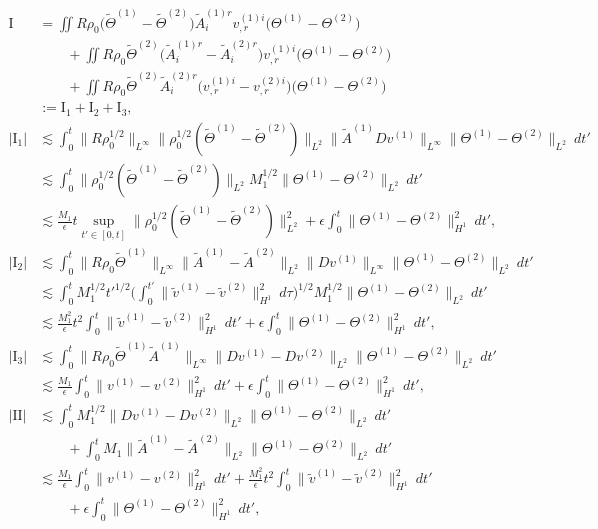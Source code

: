 \documentclass[12pt,a4paper]{amsart}
\numberwithin{equation}{section}
\theoremstyle{plain}
\theoremstyle{definition}
\begin{document}
\begin{align*}
\mathrm{I}&=\iint R\rho_0\Big(\widetilde{\Theta}^{(1)}-\widetilde{\Theta}^{(2)}\Big)\widetilde{A}^{(1)r}_iv^{(1)i}_{,r} \Big( \Theta^{(1)}-\Theta^{(2)}\Big)\\
 &\qquad +\iint R\rho_0\widetilde{\Theta}^{(2)}\Big(\widetilde{A}^{(1)r}_i-\widetilde{A}^{(2)r}_i\Big)v^{(1)i}_{,r} \Big( \Theta^{(1)}-\Theta^{(2)}\Big)\\
 &\qquad +\iint R\rho_0\widetilde{\Theta}^{(2)}\widetilde{A}^{(2)r}_i\Big(v^{(1)i}_{,r} -v^{(2)i}_{,r} \Big)\Big( \Theta^{(1)}-\Theta^{(2)}\Big)\\
 &:=\mathrm{I}_1+ \mathrm{I}_2+\mathrm{I}_3,\\
|\mathrm{I}_1|&\lesssim \int_{0}^{t}\|R\rho_0^{1/2}\|_{L^{\infty}}\|\rho_0^{1/2}(\widetilde{\Theta}^{(1)}-\widetilde{\Theta}^{(2)})\|_{L^2}\|\widetilde{A}^{(1)}Dv^{(1)}\|_{L^{\infty}} \|\Theta^{(1)}-\Theta^{(2)}\|_{L^{2}} \ dt'\\
 &\lesssim \int_{0}^{t}\|\rho_0^{1/2}(\widetilde{\Theta}^{(1)}-\widetilde{\Theta}^{(2)})\|_{L^2}M_1^{1/2}\|\Theta^{(1)}-\Theta^{(2)}\|_{L^{2}} \ dt'\\
 &\lesssim \frac{M_1}{\epsilon}t\sup\limits_{t'\in[0,t]}\|\rho_{0}^{1/2}(\widetilde{\Theta}^{(1)}-\widetilde{\Theta}^{(2)})\|_{L^{2}}^2 +\epsilon\int_{0}^{t} \|\Theta^{(1)}-\Theta^{(2)}\|_{H^1}^2 \ dt',\\
 |\mathrm{I}_2|&\lesssim \int_{0}^{t}\|R\rho_0\widetilde{\Theta}^{(1)}\|_{L^{\infty}} \|\widetilde{A}^{(1)}-\widetilde{A}^{(2)}\|_{L^2}\|Dv^{(1)}\|_{L^{\infty}} \|\Theta^{(1)}-\Theta^{(2)}\|_{L^{2}} \ dt'\\
 &\lesssim \int_{0}^{t}M_1^{1/2} t'^{1/2} \Big(\int_{0}^{t'} \|\widetilde{v}^{(1)}-\widetilde{v}^{(2)}\|_{H^1}^2\ d\tau \Big)^{1/2} M_1^{1/2} \|\Theta^{(1)}-\Theta^{(2)}\|_{L^{2}} \ dt'\\
 &\lesssim \frac{M_1^2}{\epsilon}t^2\int_{0}^{t} \|\widetilde{v}^{(1)}-\widetilde{v}^{(2)}\|_{H^1}^2 \ dt' +\epsilon\int_{0}^{t} \|\Theta^{(1)}-\Theta^{(2)}\|_{H^1}^2 \ dt',\\
|\mathrm{I}_3|&\lesssim
\int_{0}^{t} \|R\rho_0\widetilde{\Theta}^{(1)}\widetilde{A}^{(1)}\|_{L^{\infty} } \|Dv^{(1)}-Dv^{(2)} \|_{L^2} \|\Theta^{(1)}-\Theta^{(2)}\|_{L^2}\ dt'\\
 &\lesssim \frac{M_1}{\epsilon}\int_{0}^{t}  \|v^{(1)}-v^{(2)} \|_{H^1}^2\ dt'+\epsilon\int_{0}^{t}\|\Theta^{(1)}-\Theta^{(2)} \|_{H^1}^2 \ dt',\\
|\mathrm{II}|&\lesssim \int_{0}^{t} M_1^{1/2} \|Dv^{(1)}-Dv^{(2)}\|_{L^{2}}\|\Theta^{(1)}-\Theta^{(2)}\|_{L^2} \ dt'\\
&\qquad+\int_{0}^{t} M_1 \|\widetilde{A}^{(1)}-\widetilde{A}^{(2)}\|_{L^{2}}\|\Theta^{(1)}-\Theta^{(2)}\|_{L^2} \ dt'\\
&\lesssim \frac{M_1}{\epsilon}\int_{0}^{t}  \|v^{(1)}-v^{(2)} \|_{H^1}^2\ dt'+\frac{M_1^2}{\epsilon}t^2\int_{0}^{t} \|\widetilde{v}^{(1)}-\widetilde{v}^{(2)}\|_{H^1}^2 \ dt'\\
&\qquad+\epsilon\int_{0}^{t}\|\Theta^{(1)}-\Theta^{(2)} \|_{H^1}^2 \ dt',
\end{align*}
\end{document}
